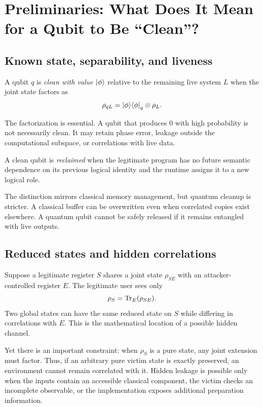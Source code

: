 \section{Preliminaries: What Does It Mean for a Qubit to Be ``Clean''?}
\label{sec:preliminaries}

\subsection{Known state, separability, and liveness}

\begin{definition}
A qubit $q$ is \emph{clean with value $\ket{\phi}$} relative to the remaining
live system $L$ when the joint state factors as
\begin{equation}
  \rho_{qL}=\ket{\phi}\!\bra{\phi}_{q}\otimes\rho_L.
  \label{eq:clean-definition}
\end{equation}
\end{definition}

The factorization is essential. A qubit that produces $0$ with high probability
is not necessarily clean. It may retain phase error, leakage outside the
computational subspace, or correlations with live data.

\begin{definition}
A clean qubit is \emph{reclaimed} when the legitimate program has no future
semantic dependence on its previous logical identity and the runtime assigns it
to a new logical role.
\end{definition}

The distinction mirrors classical memory management, but quantum cleanup is
stricter. A classical buffer can be overwritten even when correlated copies
exist elsewhere. A quantum qubit cannot be safely released if it remains
entangled with live outputs.

\subsection{Reduced states and hidden correlations}

Suppose a legitimate register $S$ shares a joint state $\rho_{SE}$ with an
attacker-controlled register $E$. The legitimate user sees only
\begin{equation}
  \rho_S=\operatorname{Tr}_E(\rho_{SE}).
\end{equation}
Two global states can have the same reduced state on $S$ while differing in
correlations with $E$. This is the mathematical location of a possible hidden
channel.

Yet there is an important constraint: when $\rho_S$ is a pure state, any joint
extension must factor. Thus, if an arbitrary pure victim state is exactly
preserved, an environment cannot remain correlated with it. Hidden leakage is
possible only when the inputs contain an accessible classical component, the
victim checks an incomplete observable, or the implementation exposes
additional preparation information.
